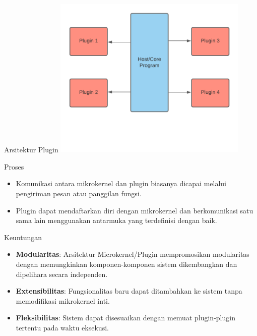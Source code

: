 \documentclass[aspectratio=169, table]{beamer}
\begin{document}
    \begin{frame}{Arsitektur Plugin}
        \vspace{30pt}
        \centering
        \includegraphics[width=0.7\textwidth]{../../images/plugin2}
    \end{frame}


    \begin{frame}{Proses}
        \begin{itemize}
            \item Komunikasi antara mikrokernel dan plugin biasanya dicapai melalui pengiriman pesan atau panggilan fungsi.
            \item Plugin dapat mendaftarkan diri dengan mikrokernel dan berkomunikasi satu sama lain menggunakan antarmuka yang terdefinisi dengan baik.
        \end{itemize}
    \end{frame}

    \begin{frame}{Keuntungan}
        \begin{itemize}
            \item \textbf{Modularitas}: Arsitektur Microkernel/Plugin mempromosikan modularitas dengan memungkinkan komponen-komponen sistem dikembangkan dan dipelihara secara independen.
            \item \textbf{Extensibilitas}: Fungsionalitas baru dapat ditambahkan ke sistem tanpa memodifikasi mikrokernel inti.
            \item \textbf{Fleksibilitas}: Sistem dapat disesuaikan dengan memuat plugin-plugin tertentu pada waktu eksekusi.
        \end{itemize}
    \end{frame}
\end{document}
